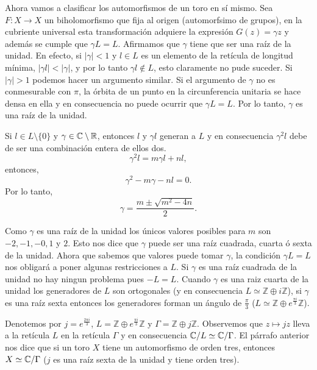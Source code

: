 Ahora vamos a clasificar los automorfismos de un toro en sí mismo. Sea $F\colon X\rightarrow X$ un biholomorfismo que fija al origen (automorfsimo de grupos), en la cubriente universal esta transformación adquiere la expresión $G(z)=\gamma z$ y además se cumple que $\gamma L=L$. Afirmamos que $\gamma$ tiene que ser una raíz de la unidad. En efecto, si $|\gamma|<1$ y $l\in L$ es un elemento de la retícula de longitud mínima, $|\gamma l|<|\gamma|$, y por lo tanto $\gamma l\notin L$, esto claramente no pude suceder. Si $|\gamma|>1$ podemos hacer un argumento similar. Si el argumento de $\gamma$ no es conmesurable con $\pi$, la órbita de un punto en la circunferencia unitaria se hace densa en ella y en consecuencia no puede ocurrir que $\gamma L = L$. Por lo tanto, $\gamma$ es una raíz de la unidad.

Si $l\in L\setminus \{ 0\}$ y $\gamma\in\mathbb{C}\setminus\mathbb{R}$, entonces $l$ y $\gamma l$ generan a $L$ y en consecuencia $\gamma^{2} l$ debe de ser una combinación entera de ellos dos.
\begin{equation*}
\gamma^{2} l =m\gamma l +nl,
\end{equation*}
\noindent entonces,
\begin{equation*}
\gamma^{2}-m\gamma-nl=0.
\end{equation*}
\noindent Por lo tanto,
\begin{equation}
\label{TorosPosibles}
\gamma=\frac{m\pm \sqrt{m^{2}-4n}}{2}.
\end{equation}

\noindent Como $\gamma$ es una raíz de la unidad los únicos valores posibles para $m$ son $-2,-1,-0,1$ y $2$. Esto nos dice que $\gamma$ puede ser una raíz cuadrada, cuarta ó sexta de la unidad. Ahora que sabemos que valores puede tomar $\gamma$, la condición $\gamma L =L$ nos obligará a poner algunas restricciones a $L$. Si $\gamma$ es una raíz cuadrada de la unidad no hay ningun problema pues $-L=L$. Cuando $\gamma$ es una raiz cuarta de la unidad los generadores de $L$ son ortogonales (y en consecuencia $L\simeq \mathbb{Z}\oplus i\mathbb{Z}$), si $\gamma$ es una raíz sexta entonces los generadores forman un ángulo de $\tfrac{\pi}{3}$ ($L\simeq \mathbb{Z}\oplus e^{\tfrac{\pi i}{3}}\mathbb{Z}$).

Denotemos por $j=e^{\tfrac{2\pi i}{3}}$, $L=\mathbb{Z}\oplus e^{\tfrac{\pi i}{3}}\mathbb{Z}$
y $\Gamma=\mathbb{Z}\oplus j\mathbb{Z}$. Observemos que $z\mapsto jz$ lleva a la retícula $L$ en la retícula $\Gamma$ y en consecuencia $\mathbb{C}/L\simeq\mathbb{C}/\Gamma$. El párrafo anterior nos dice que si un toro $X$ tiene un automorfismo de orden tres, entonces $X\simeq\mathbb{C}/\Gamma$ ($j$ es una raíz sexta de la unidad y tiene orden tres).
